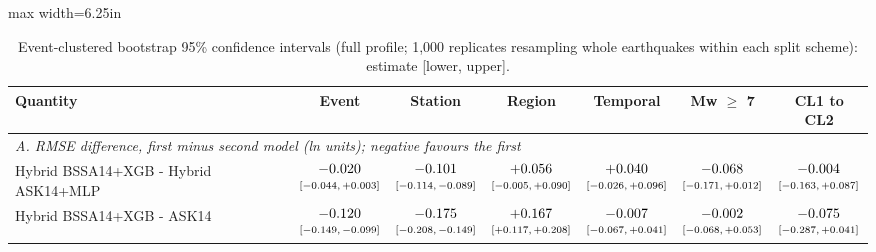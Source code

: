 \begin{table}[htbp]
\centering
\caption{Event-clustered bootstrap 95\% confidence intervals (full profile; 1,000 replicates resampling whole earthquakes within each split scheme): estimate [lower, upper].}
\label{tab:tableS3_bootstrap_cis}
\small
\begin{adjustbox}{max width=6.25in}
\begin{tabular}{lcccccc}
\toprule
Quantity & Event & Station & Region & Temporal & Mw $\geq$ 7 & CL1 to CL2 \\
\midrule
\multicolumn{7}{l}{\textit{A. RMSE difference, first minus second model (ln units); negative favours the first}} \\
Hybrid BSSA14+XGB - Hybrid ASK14+MLP & $\begin{array}{@{}c@{}}-0.020\\[-1pt] \scriptstyle[-0.044,\,+0.003]\end{array}$ & $\begin{array}{@{}c@{}}-0.101\\[-1pt] \scriptstyle[-0.114,\,-0.089]\end{array}$ & $\begin{array}{@{}c@{}}+0.056\\[-1pt] \scriptstyle[-0.005,\,+0.090]\end{array}$ & $\begin{array}{@{}c@{}}+0.040\\[-1pt] \scriptstyle[-0.026,\,+0.096]\end{array}$ & $\begin{array}{@{}c@{}}-0.068\\[-1pt] \scriptstyle[-0.171,\,+0.012]\end{array}$ & $\begin{array}{@{}c@{}}-0.004\\[-1pt] \scriptstyle[-0.163,\,+0.087]\end{array}$ \\
Hybrid BSSA14+XGB - ASK14 & $\begin{array}{@{}c@{}}-0.120\\[-1pt] \scriptstyle[-0.149,\,-0.099]\end{array}$ & $\begin{array}{@{}c@{}}-0.175\\[-1pt] \scriptstyle[-0.208,\,-0.149]\end{array}$ & $\begin{array}{@{}c@{}}+0.167\\[-1pt] \scriptstyle[+0.117,\,+0.208]\end{array}$ & $\begin{array}{@{}c@{}}-0.007\\[-1pt] \scriptstyle[-0.067,\,+0.041]\end{array}$ & $\begin{array}{@{}c@{}}-0.002\\[-1pt] \scriptstyle[-0.068,\,+0.053]\end{array}$ & $\begin{array}{@{}c@{}}-0.075\\[-1pt] \scriptstyle[-0.287,\,+0.041]\end{array}$ \\

\end{tabular}
\end{adjustbox}
\end{table}
